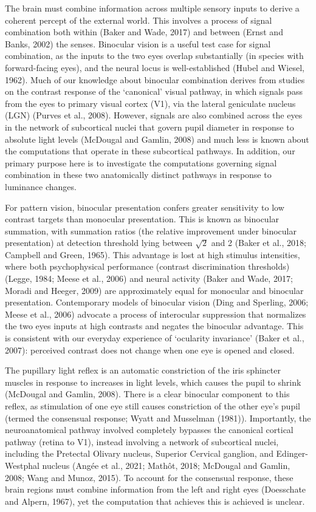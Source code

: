 \documentclass[
]{article}
\begin{document}
The brain must combine information across multiple sensory inputs to derive a coherent percept of the external world. This involves a process of signal combination both within (Baker and Wade, 2017) and between (Ernst and Banks, 2002) the senses. Binocular vision is a useful test case for signal combination, as the inputs to the two eyes overlap substantially (in species with forward-facing eyes), and the neural locus is well-established (Hubel and Wiesel, 1962). Much of our knowledge about binocular combination derives from studies on the contrast response of the `canonical' visual pathway, in which signals pass from the eyes to primary visual cortex (V1), via the lateral geniculate nucleus (LGN) (Purves et al., 2008). However, signals are also combined across the eyes in the network of subcortical nuclei that govern pupil diameter in response to absolute light levels (McDougal and Gamlin, 2008) and much less is known about the computations that operate in these subcortical pathways. In addition, our primary purpose here is to investigate the computations governing signal combination in these two anatomically distinct pathways in response to luminance changes.

For pattern vision, binocular presentation confers greater sensitivity to low contrast targets than monocular presentation. This is known as binocular summation, with summation ratios (the relative improvement under binocular presentation) at detection threshold lying between \(\sqrt{2}\) and 2 (Baker et al., 2018; Campbell and Green, 1965). This advantage is lost at high stimulus intensities, where both psychophysical performance (contrast discrimination thresholds) (Legge, 1984; Meese et al., 2006) and neural activity (Baker and Wade, 2017; Moradi and Heeger, 2009) are approximately equal for monocular and binocular presentation. Contemporary models of binocular vision (Ding and Sperling, 2006; Meese et al., 2006) advocate a process of interocular suppression that normalizes the two eyes inputs at high contrasts and negates the binocular advantage. This is consistent with our everyday experience of `ocularity invariance' (Baker et al., 2007): perceived contrast does not change when one eye is opened and closed.

The pupillary light reflex is an automatic constriction of the iris sphincter muscles in response to increases in light levels, which causes the pupil to shrink (McDougal and Gamlin, 2008). There is a clear binocular component to this reflex, as stimulation of one eye still causes constriction of the other eye's pupil (termed the consensual response; Wyatt and Musselman (1981)). Importantly, the neuroanatomical pathway involved completely bypasses the canonical cortical pathway (retina to V1), instead involving a network of subcortical nuclei, including the Pretectal Olivary nucleus, Superior Cervical ganglion, and Edinger-Westphal nucleus (Angée et al., 2021; Mathôt, 2018; McDougal and Gamlin, 2008; Wang and Munoz, 2015). To account for the consensual response, these brain regions must combine information from the left and right eyes (Doesschate and Alpern, 1967), yet the computation that achieves this is achieved is unclear.
\end{document}
